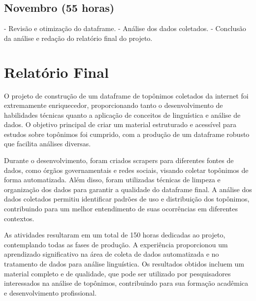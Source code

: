 \documentclass{article}
\begin{document}
\subsection*{Novembro (55 horas)}
- Revisão e otimização do dataframe.
- Análise dos dados coletados.
- Conclusão da análise e redação do relatório final do projeto.

\section*{Relatório Final}
O projeto de construção de um dataframe de topônimos coletados da internet foi extremamente enriquecedor, proporcionando tanto o desenvolvimento de habilidades técnicas quanto a aplicação de conceitos de linguística e análise de dados. O objetivo principal de criar um material estruturado e acessível para estudos sobre topônimos foi cumprido, com a produção de um dataframe robusto que facilita análises diversas.

Durante o desenvolvimento, foram criados scrapers para diferentes fontes de dados, como órgãos governamentais e redes sociais, visando coletar topônimos de forma automatizada. Além disso, foram utilizadas técnicas de limpeza e organização dos dados para garantir a qualidade do dataframe final. A análise dos dados coletados permitiu identificar padrões de uso e distribuição dos topônimos, contribuindo para um melhor entendimento de suas ocorrências em diferentes contextos.

As atividades resultaram em um total de 150 horas dedicadas ao projeto, contemplando todas as fases de produção. A experiência proporcionou um aprendizado significativo na área de coleta de dados automatizada e no tratamento de dados para análise linguística. Os resultados obtidos incluem um material completo e de qualidade, que pode ser utilizado por pesquisadores interessados na análise de topônimos, contribuindo para sua formação acadêmica e desenvolvimento profissional.
\end{document}
